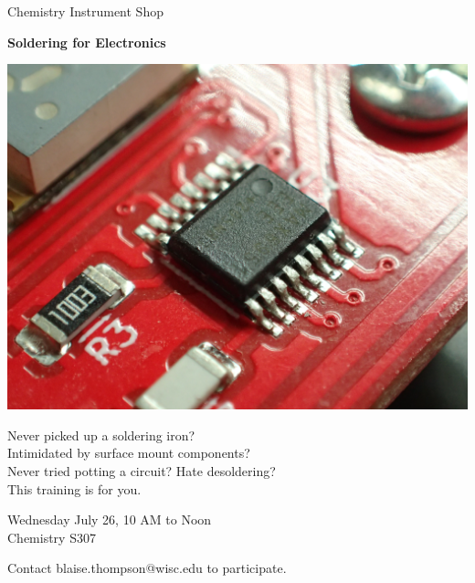 \documentclass{article}
\begin{document}
\center

\Huge

Chemistry Instrument Shop

\textbf{
Soldering for Electronics
}

\includegraphics[width=\linewidth]{coverart.jpg}

{
\LARGE
Never picked up a soldering iron? \\
Intimidated by surface mount components? \\
Never tried potting a circuit? 
Hate desoldering? \\
This training is for you. \\
}

\vfill

{
\huge
Wednesday July 26, 10 AM to Noon \\
Chemistry S307
}

\vfill

{
\huge
Contact blaise.thompson@wisc.edu to participate.
}
\end{document}
